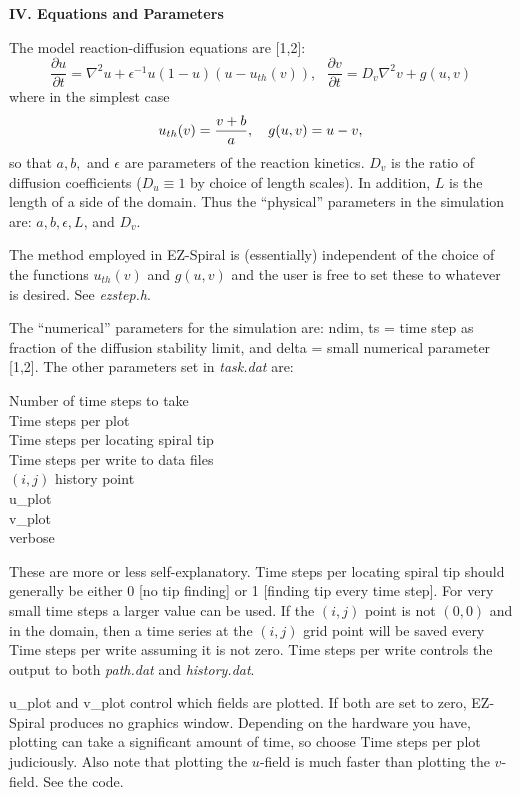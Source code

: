 {\bf IV. Equations and Parameters} 

The model reaction-diffusion equations are [1,2]:
$$
\frac{\partial u }{ \partial t} = \nabla^2 u + 
	\epsilon^{-1} u(1-u)(u-u_{th}(v)), ~~~
\frac{\partial v }{ \partial t} = D_v \nabla^2 v + g(u,v)
$$
where in the simplest case
$$
u_{th}(v) = {{v+b}\over{a}}, ~~~
g(u,v) = u-v, 
$$ 
so that $a,b,$ and $\epsilon$ are parameters of the reaction
kinetics.  $D_v$ is the ratio of diffusion coefficients ($D_u \equiv
1$ by choice of length scales). In addition, $L$ is the length
of a side of the domain. Thus the ``physical'' parameters in the
simulation are: $a, b, \epsilon, L$, and $D_v$.

The method employed in EZ-Spiral is (essentially) independent of the
choice of the functions $u_{th}(v)$ and $g(u,v)$ and the user is free
to set these to whatever is desired.  See {\em ezstep.h}.

The ``numerical'' parameters for the simulation are: {\sf ndim}, {\sf
ts} = time step as fraction of the diffusion stability limit, and {\sf
delta} = small numerical parameter [1,2].  The other parameters set in
{\em task.dat} are:

\begin{list}{dummy}
{\partopsep=-10pt\parsep=-10pt\itemsep=0pt}
\item[~]{\sf Number of time steps to take} \\
        {\sf Time steps per plot} \\
        {\sf Time steps per locating spiral tip} \\
        {\sf Time steps per write to data files} \\
        $(i,j)$ {\sf history point} \\
	{\sf u\_plot} \\
	{\sf v\_plot} \\
	{\sf verbose} 
\end{list}

These are more or less self-explanatory. {\sf Time steps per locating
spiral tip} should generally be either 0 [no tip finding] or 1
[finding tip every time step].  For very small time steps a larger
value can be used. If the $(i,j)$ point is not $(0,0)$ and in the
domain, then a time series at the $(i,j)$ grid point will be saved
every {\sf Time steps per write} assuming it is not zero.  {\sf Time
steps per write} controls the output to both {\em path.dat} and {\em
history.dat}.

{\sf u\_plot} and {\sf v\_plot} control which fields are plotted.  If
both are set to zero, EZ-Spiral produces no graphics window.
Depending on the hardware you have, plotting can take a significant
amount of time, so choose {\sf Time steps per plot} judiciously.  Also
note that plotting the $u$-field is much faster than plotting the
$v$-field. See the code.

